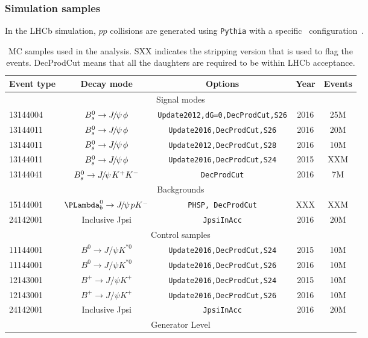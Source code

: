\subsubsection{Simulation samples}

In the LHCb simulation, $pp$ collisions are generated using
{\tt Pythia} with a specific \lhcb\ configuration~\cite{Sjostrand:2006za,
LHCb-PROC-2010-056}.

\begin{table}[h]
\begin{center}
\begin{tabular}{lcccc}
    \hline
    Event type & Decay mode & Options & Year & Events \\
    \hline
    \multicolumn{5}{c}{Signal modes}\\
    \hline
    13144004 & $B^0_s\to{\ensuremath{{J\mskip -3mu/\mskip -2mu\psi\mskip 2mu}}}\phi$ & {\tt Update2012,dG=0,DecProdCut,S26} &  2016 & 25M \\
    13144011 & $B^0_s\to{\ensuremath{{J\mskip -3mu/\mskip -2mu\psi\mskip 2mu}}}\phi$ & {\tt Update2016,DecProdCut,S26} & 2016 & 20M \\
    13144011 & $B^0_s\to{\ensuremath{{J\mskip -3mu/\mskip -2mu\psi\mskip 2mu}}}\phi$ & {\tt Update2012,DecProdCut,S28} & 2016 & 10M \\
    13144011 & $B^0_s\to{\ensuremath{{J\mskip -3mu/\mskip -2mu\psi\mskip 2mu}}}\phi$ & {\tt Update2016,DecProdCut,S24} & 2015 & XXM \\
    13144041 & $B^0_s\to{\ensuremath{{J\mskip -3mu/\mskip -2mu\psi\mskip 2mu}}}K^+K^-$ & {\tt DecProdCut} & 2016 & 7M \\
    \hline
    \multicolumn{5}{c}{Backgrounds}\\
    \hline
    15144001 & $\Lb\to\jpsi p\Km$    & {\tt PHSP, DecProdCut} &  XXX & XXM \\
    24142001 & Inclusive Jpsi & {\tt JpsiInAcc} &  2016 & 20M \\
    \hline
    \multicolumn{5}{c}{Control samples}\\
    \hline
    11144001 & $B^0 \to J/\psi K^{*0}$    & {\tt Update2016,DecProdCut,S24} & 2015  & 10M \\
    11144001 & $B^0 \to J/\psi K^{*0}$    & {\tt Update2016,DecProdCut,S26} & 2016  & 10M \\
    12143001 & $B^+ \to J/\psi K^+$    & {\tt Update2016,DecProdCut,S24} & 2015  & 10M \\
    12143001 & $B^+ \to J/\psi K^+$    & {\tt Update2016,DecProdCut,S26} & 2016  & 10M \\
    24142001 & Inclusive Jpsi & {\tt JpsiInAcc} &  2016 & 20M \\
    \hline
    \multicolumn{5}{c}{Generator Level}\\
    \hline
\end{tabular}
\caption{MC samples used in the analysis. SXX indicates the stripping version that is used to flag the events. DecProdCut means that all the daughters are required to be within LHCb acceptance.
}
\label{tab:mc}
\end{center}
\end{table}

